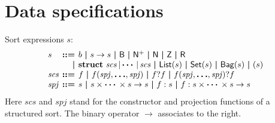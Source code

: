 \documentclass[a4paper,fleqn,10pt]{article}
\makeatletter
\newcommand{\f}[1]{\ensuremath{\mathit{#1}}}
\newcommand{\sbool}{\ensuremath{\mathsf{B}}}
\newcommand{\snat}{\ensuremath{\mathsf{N}}}
\newcommand{\spos}{\ensuremath{\snat^{+}}}
\newcommand{\sint}{\ensuremath{\mathsf{Z}}}
\newcommand{\sreal}{\ensuremath{\mathsf{R}}}
\newenvironment{tightarray}[1]
  {\setlength{\arraycolsep}{2pt}%
   \begin{array}{@{}#1@{}}%
  }
  {\end{array}%
  }
\newcommand{\mb}[1]{\text{\boldmath$#1$}}
\newcommand{\kwstruct}{{\bf struct}}
\makeatother
\begin{document}
\section{Data specifications}

Sort expressions $s$:
\[\begin{tightarray}{lrl}
s      & \mb{::=} & b\ \mb{|}\ s \to s\ \mb{|}\
               \sbool\ \mb{|}\ \spos\ \mb{|}\ \snat\ \mb{|}\ \sint\ \mb{|}\ \sreal\\
       & \mb{|}   &
               \kwstruct\ \f{scs}\,|\,\mb{\cdots}\,|\,\f{scs}\ \mb{|}\
               \mathsf{List}(s)\ \mb{|}\ \mathsf{Set}(s)\ \mb{|}\ \mathsf{Bag}(s)\ \mb{|}\
               ( s )\\
\f{scs} & \mb{::=} & f\ \mb{|}\ f(\f{spj},\mb{\ldots},\f{spj})\ \mb{|}\
                f ? f\ \mb{|}\ f(\f{spj},\mb{\ldots},\f{spj})?f \\
\f{spj} & \mb{::=} & s\ \mb{|}\ s \times \mb{\cdots} \times s \to s\ \mb{|}\
                f: s\ \mb{|}\ f: s \times \mb{\cdots} \times s \to s
\end{tightarray}\]
Here $\f{scs}$ and $\f{spj}$ stand for the constructor and projection functions of a structured sort.
The binary operator $\to$ associates to the right.
\end{document}
